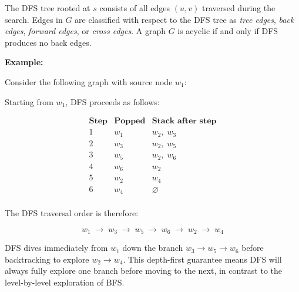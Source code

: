 \documentclass[12pt,a4paper,openany]{article}
\begin{document}
The DFS tree rooted at $s$ consists of all edges $(u, v)$ traversed
during the search. Edges in $G$ are classified with respect to the DFS tree as
\emph{tree edges}, \emph{back edges}, \emph{forward edges}, or \emph{cross edges}.
A graph $G$ is acyclic if and only if DFS produces no back edges.


\textbf{Example:}

Consider the following graph with source node $w_1$:

\begin{center}
\end{center}

Starting from $w_1$, DFS proceeds as follows:

\[
\begin{array}{c|c|c}
\textbf{Step} & \textbf{Popped} & \textbf{Stack after step} \\
\hline
1 & w_1 & w_2,\; w_3 \\
2 & w_3 & w_2,\; w_5 \\
3 & w_5 & w_2,\; w_6 \\
4 & w_6 & w_2 \\
5 & w_2 & w_4 \\
6 & w_4 & \varnothing \\
\end{array}
\]

The DFS traversal order is therefore:

\[
w_1 \;\to\; w_3 \;\to\; w_5 \;\to\; w_6 \;\to\; w_2 \;\to\; w_4
\]

DFS dives immediately from $w_1$ down the branch $w_3 \to w_5 \to w_6$
before backtracking to explore $w_2 \to w_4$. This depth-first guarantee
means DFS will always fully explore one branch before moving to the next,
in contrast to the level-by-level exploration of BFS.
\end{document}
